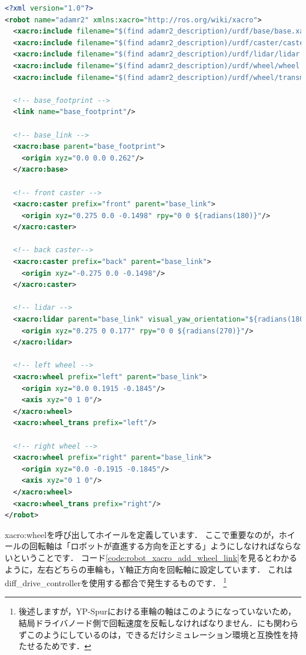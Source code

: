 \documentclass[{../../master}]{subfiles}
\begin{document}
\begin{lstlisting}[language=XML, label=code:robot_xacro_add_wheel_link, caption=Add \textsf{wheel\_link} to Robot Model]
<?xml version="1.0"?>
<robot name="adamr2" xmlns:xacro="http://ros.org/wiki/xacro">
  <xacro:include filename="$(find adamr2_description)/urdf/base/base.xacro"/>
  <xacro:include filename="$(find adamr2_description)/urdf/caster/caster.xacro"/>
  <xacro:include filename="$(find adamr2_description)/urdf/lidar/lidar.xacro"/>
  <xacro:include filename="$(find adamr2_description)/urdf/wheel/wheel.xacro"/>
  <xacro:include filename="$(find adamr2_description)/urdf/wheel/transmission.xacro"/>

  <!-- base_footprint -->
  <link name="base_footprint"/>

  <!-- base_link -->
  <xacro:base parent="base_footprint">
    <origin xyz="0.0 0.0 0.262"/>
  </xacro:base>

  <!-- front caster -->
  <xacro:caster prefix="front" parent="base_link">
    <origin xyz="0.275 0.0 -0.1498" rpy="0 0 ${radians(180)}"/>
  </xacro:caster>

  <!-- back caster-->
  <xacro:caster prefix="back" parent="base_link">
    <origin xyz="-0.275 0.0 -0.1498"/>
  </xacro:caster>

  <!-- lidar -->
  <xacro:lidar parent="base_link" visual_yaw_orientation="${radians(180)}">
    <origin xyz="0.275 0 0.177" rpy="0 0 ${radians(270)}"/>
  </xacro:lidar>

  <!-- left wheel -->
  <xacro:wheel prefix="left" parent="base_link">
    <origin xyz="0.0 0.1915 -0.1845"/>
    <axis xyz="0 1 0"/>
  </xacro:wheel>
  <xacro:wheel_trans prefix="left"/>

  <!-- right wheel -->
  <xacro:wheel prefix="right" parent="base_link">
    <origin xyz="0.0 -0.1915 -0.1845"/>
    <axis xyz="0 1 0"/>
  </xacro:wheel>
  <xacro:wheel_trans prefix="right"/>
</robot>
\end{lstlisting}

\textsf{xacro:wheel}を呼び出してホイールを定義しています．
ここで重要なのが，ホイールの回転軸は「ロボットが直進する方向を正とする」ようにしなければならないということです．
コード\ref{code:robot_xacro_add_wheel_link}を見るとわかるように，左右どちらの車輪も，Y軸正方向を回転軸に設定しています．
これは\textsf{diff\_drive\_controller}を使用する都合で発生するものです．
\footnote{後述しますが，YP-Spurにおける車輪の軸はこのようになっていないため，結局ドライバノード側で回転速度を反転しなければなりません．にも関わらずこのようにしているのは，できるだけシミュレーション環境と互換性を持たせるためです．}
\end{document}
